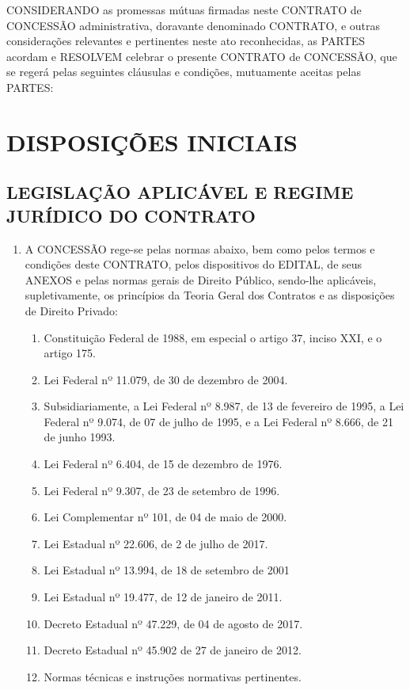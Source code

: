 \documentclass[a4paper,11pt]{report} %
\begin{document}
CONSIDERANDO as promessas mútuas firmadas neste CONTRATO de CONCESSÃO administrativa, doravante denominado CONTRATO, e outras considerações relevantes e pertinentes neste ato reconhecidas, as PARTES acordam e
RESOLVEM celebrar o presente CONTRATO de CONCESSÃO, que se regerá pelas seguintes cláusulas e condições, mutuamente aceitas pelas PARTES:

\chapter{DISPOSIÇÕES INICIAIS}
\section{LEGISLAÇÃO APLICÁVEL E REGIME JURÍDICO DO CONTRATO}
\label{sec:PAHT}

\begin{enumerate}
\item \label{itm:A5JT} A CONCESSÃO rege-se pelas normas abaixo, bem como pelos termos e condições deste CONTRATO, pelos dispositivos do EDITAL, de seus ANEXOS e pelas normas gerais de Direito Público, sendo-lhe aplicáveis, supletivamente, os princípios da Teoria Geral dos Contratos e as disposições de Direito Privado:

\begin{enumerate}[label*=\arabic*.]
\item \label{itm:3CK8} Constituição Federal de 1988, em especial o artigo 37, inciso XXI, e o artigo 175.
\item \label{itm:6FZL} Lei Federal nº 11.079, de 30 de dezembro de 2004.
\item \label{itm:3QJD} Subsidiariamente, a Lei Federal nº 8.987, de 13 de fevereiro de 1995, a Lei Federal nº 9.074, de 07 de julho de 1995, e a Lei Federal nº 8.666, de 21 de junho 1993.
\item \label{itm:WHLA} Lei Federal nº 6.404, de 15 de dezembro de 1976.
\item \label{itm:628W} Lei Federal nº 9.307, de 23 de setembro de 1996.
\item \label{itm:9YPH} Lei Complementar nº 101, de 04 de maio de 2000.
\item \label{itm:6WF3} Lei Estadual nº 22.606, de 2 de julho de 2017.
\item \label{itm:EUAC} Lei Estadual nº 13.994, de 18 de setembro de 2001
\item \label{itm:NFZG} Lei Estadual nº 19.477, de 12 de janeiro de 2011.
\item \label{itm:E8WP} Decreto Estadual nº 47.229, de 04 de agosto de 2017.
\item \label{itm:ZGSQ} Decreto Estadual nº 45.902 de 27 de janeiro de 2012.
\item \label{itm:XVAC} Normas técnicas e instruções normativas pertinentes.
\end{enumerate}



\end{enumerate}
\end{document}
